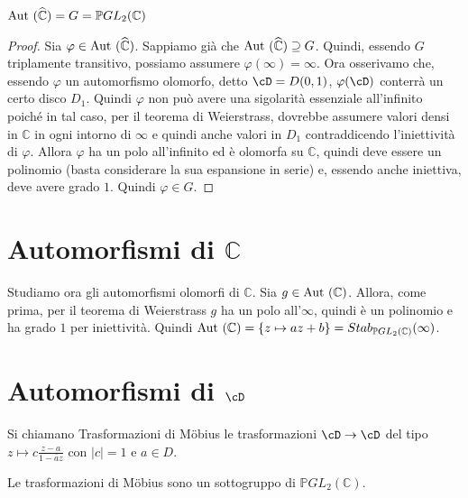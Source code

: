 \begin{proposizione}
$\text{Aut }(\widehat{\mathbb{C}} ) = G = \mathbb{P}GL_2 (\mathbb{C} )$
\end{proposizione}
\begin{proof}
Sia $\varphi \in \text{Aut } (\widehat{\mathbb{C}} )$. Sappiamo già che $\text{Aut } (\widehat{\mathbb{C}} ) \supseteq G$.
Quindi, essendo $G$ triplamente transitivo, possiamo assumere $\varphi( \infty ) = \infty$.
	Ora osserivamo che, essendo $\varphi$ un automorfismo olomorfo, detto $\cD=D(0,1)$, $\varphi (\cD)$ conterrà
un certo disco $D_1$. Quindi $\varphi$ non può avere una sigolarità essenziale all'infinito poiché in tal caso,
per il teorema di Weierstrass, dovrebbe assumere valori densi in $\mathbb{C}$ in ogni intorno di $\infty$
e quindi anche valori in $D_1$ contraddicendo l'iniettività di $\varphi$.
Allora $\varphi$ ha un polo all'infinito ed è olomorfa su $\mathbb{C}$, quindi deve essere un polinomio (basta considerare la sua espansione in serie) e,
essendo anche iniettiva, deve avere grado $1$. Quindi $\varphi \in G$.
\end{proof}


\section{Automorfismi di $\mathbb{C}$}
Studiamo ora gli automorfismi olomorfi di $\mathbb{C}$.
Sia $g \in \text{Aut }(\mathbb{C})$. Allora, come prima, per il teorema di Weierstrass $g$ ha un polo all'$\infty$,
quindi è un polinomio e ha grado $1$ per iniettività. Quindi
$\text{Aut }(\mathbb{C} )= \left\{ z\mapsto az+b \right\} = Stab_{\mathbb{P} GL_2 (\mathbb{C})} (\infty )$.


\section{Automorfismi di $\cD$}
\begin{definizione}
	Si chiamano Trasformazioni di Möbius le trasformazioni $\cD \rar \cD$ del tipo $z\mapsto c \displaystyle{\frac{z-a}{1- \bar{a}z}}$ con $|c|=1$ e $a \in D$.
\end{definizione}


\begin{esercizio}
Le trasformazioni di Möbius sono un sottogruppo di $\mathbb{P} GL_2 (\mathbb{C})$.
\end{esercizio}

